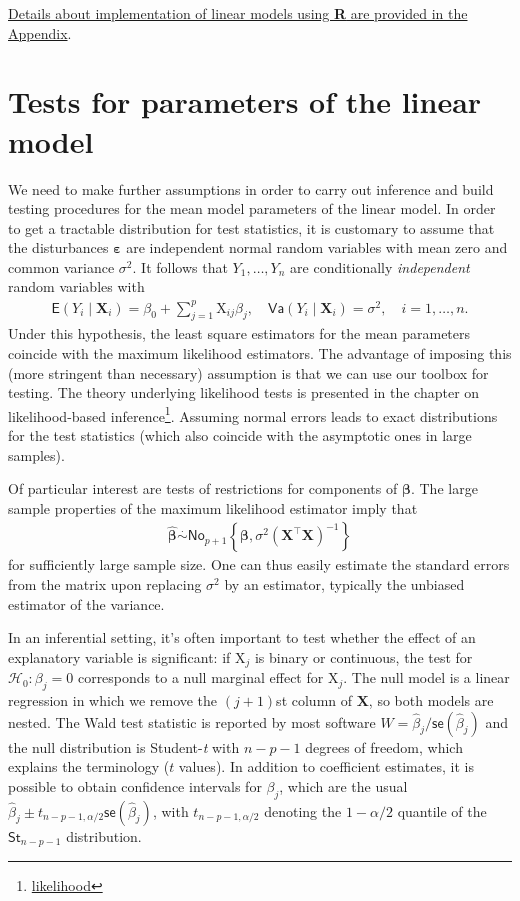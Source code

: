 \documentclass[
  11pt,
  letterpaper,
]{book}
\renewcommand{\href}[2]{#2\footnote{\url{#1}}}
\theoremstyle{definition}
\theoremstyle{definition}
\theoremstyle{definition}
\theoremstyle{remark}
\begin{document}
\protect\hyperlink{rlmfunc}{Details about implementation of linear models using \textbf{R} are provided in the Appendix}.

\hypertarget{test-lm}{%
\section{Tests for parameters of the linear model}\label{test-lm}}

We need to make further assumptions in order to carry out inference and build testing procedures for the mean model parameters of the linear model. In order to get a tractable distribution for test statistics, it is customary to assume that the disturbances \(\boldsymbol{\varepsilon}\) are independent normal random variables with mean zero and common variance \(\sigma^2\). It follows that \(Y_1, \ldots, Y_n\) are conditionally \emph{independent} random variables with
\begin{align*}
\mathsf{E}(Y_i \mid \mathbf{X}_i)=\beta_0 + \sum_{j=1}^p \mathrm{X}_{ij}\beta_j, \quad  \mathsf{Va}(Y_i\mid \mathbf{X}_i)= \sigma^2, \quad i=1, \ldots, n.    
\end{align*}
Under this hypothesis, the least square estimators for the mean parameters coincide with the maximum likelihood estimators. The advantage of imposing this (more stringent than necessary) assumption is that we can use our toolbox for testing. The theory underlying likelihood tests is presented in the chapter on \href{likelihood}{likelihood-based inference}. Assuming normal errors leads to exact distributions for the test statistics (which also coincide with the asymptotic ones in large samples).

Of particular interest are tests of restrictions for components of \(\boldsymbol{\beta}\). The large sample properties of the maximum likelihood estimator imply that
\begin{align*}
\widehat{\boldsymbol{\beta}} \stackrel{\cdot}{\sim}\mathsf{No}_{p+1}\left\{\boldsymbol{\beta}, \sigma^2(\mathbf{X}^\top\mathbf{X})^{-1}\right\}
\end{align*}
for sufficiently large sample size. One can thus easily estimate the standard errors from the matrix upon replacing \(\sigma^2\) by an estimator, typically the unbiased estimator of the variance.

In an inferential setting, it's often important to test whether the effect of an explanatory variable is significant: if \(\mathrm{X}_j\) is binary or continuous, the test for \(\mathscr{H}_0: \beta_j=0\) corresponds to a null marginal effect for \(\mathrm{X}_j\). The null model is a linear regression in which we remove the \((j+1)\)st column of \(\mathbf{X}\), so both models are nested. The Wald test statistic is reported by most software \(W=\widehat{\beta}_j/\mathsf{se}(\widehat{\beta}_j)\) and the null distribution is Student-\emph{t} with \(n-p-1\) degrees of freedom, which explains the terminology (\(t\) values). In addition to coefficient estimates, it is possible to obtain confidence intervals for \(\beta_j\), which are the usual \(\widehat{\beta}_j \pm t_{n-p-1,\alpha/2} \mathsf{se}(\widehat{\beta}_j)\), with \(t_{n-p-1,\alpha/2}\) denoting the \(1-\alpha/2\) quantile of the \(\mathsf{St}_{n-p-1}\) distribution.
\end{document}
